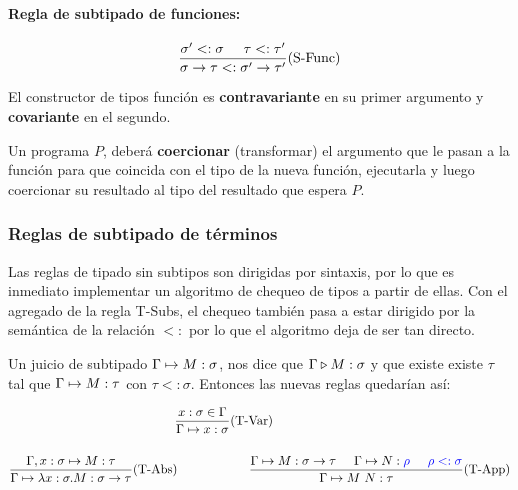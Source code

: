 \paragraph{Regla de subtipado de funciones:}

\vspace*{5mm}
$$\frac{\sigma' <: \sigma\hspace*{5mm}\tau <: \tau'}{\sigma\to\tau <: \sigma'\to\tau'}(\text{S-Func})$$

\vspace*{5mm}
El constructor de tipos función es \textbf{contravariante} en su primer argumento y \textbf{covariante} en el segundo.

Un programa $P$, deberá \textbf{coercionar} (transformar) el argumento que le pasan a la función para que coincida con el tipo de la nueva función, ejecutarla y luego coercionar su resultado al tipo del resultado que espera $P$.

\subsubsection{Reglas de subtipado de términos}
Las reglas de tipado sin subtipos son dirigidas por sintaxis, por lo que es inmediato implementar un algoritmo de chequeo de tipos a partir de ellas. Con el agregado de la regla T-Subs, el chequeo también pasa a estar dirigido por la semántica de la relación $<:$ por lo que el algoritmo deja de ser tan directo.

Un juicio de subtipado $\Gamma\mapsto M : \sigma$, nos dice que $\Gamma\triangleright M : \sigma$ y que existe existe $\tau$ tal que $\Gamma\mapsto M : \tau$ con $\tau <: \sigma$. Entonces las nuevas reglas quedarían así:

\begin{equation*}
\begin{gathered}
    \frac{x:\sigma\in\Gamma}{\judgeTypeS{\Gamma}{x}{\sigma}}(\text{T-Var})\hspace*{2cm}
\vspace*{5mm} \\
    \frac {\judgeTypeS{\Gamma,x:\sigma}{M}{\tau}}
          {\judgeTypeS{\Gamma}{\lambdaAbs{x}{\sigma}{M}}{\sigma\to\tau}}(\text{T-Abs})\hspace*{2cm}
    \frac{\judgeTypeS{\Gamma}{M}{\sigma\to\tau}\hspace*{5mm}\judgeTypeS{\Gamma}{N}{\blue{\rho}}\hspace*{5mm}\blue{\rho <: \sigma}}{\judgeTypeS{\Gamma}{M~N}{\tau}}(\text{T-App})
\end{gathered}
\end{equation*}

